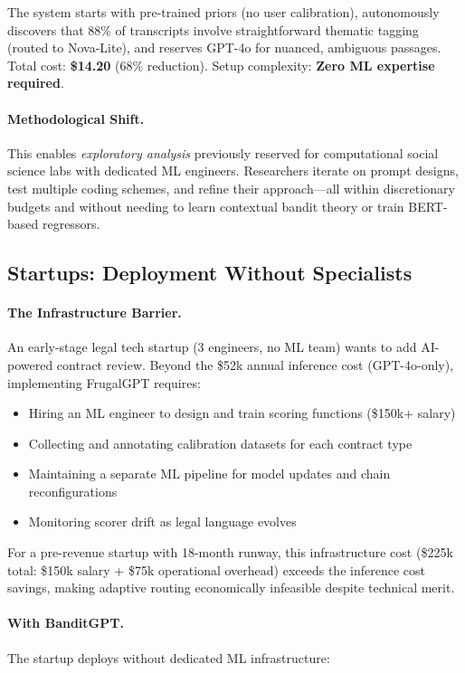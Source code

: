 The system starts with pre-trained priors (no user calibration), autonomously discovers that 88\% of transcripts involve straightforward thematic tagging (routed to Nova-Lite), and reserves GPT-4o for nuanced, ambiguous passages. Total cost: \textbf{\$14.20} (68\% reduction). Setup complexity: \textbf{Zero ML expertise required}.

\paragraph{Methodological Shift.} This enables \emph{exploratory analysis} previously reserved for computational social science labs with dedicated ML engineers. Researchers iterate on prompt designs, test multiple coding schemes, and refine their approach---all within discretionary budgets and without needing to learn contextual bandit theory or train BERT-based regressors.

\subsection{Startups: Deployment Without Specialists}

\paragraph{The Infrastructure Barrier.} An early-stage legal tech startup (3 engineers, no ML team) wants to add AI-powered contract review. Beyond the \$52k annual inference cost (GPT-4o-only), implementing FrugalGPT requires:
\begin{itemize}[leftmargin=*,nosep]
    \item Hiring an ML engineer to design and train scoring functions (\$150k+ salary)
    \item Collecting and annotating calibration datasets for each contract type
    \item Maintaining a separate ML pipeline for model updates and chain reconfigurations
    \item Monitoring scorer drift as legal language evolves
\end{itemize}

For a pre-revenue startup with 18-month runway, this infrastructure cost (\$225k total: \$150k salary + \$75k operational overhead) exceeds the inference cost savings, making adaptive routing economically infeasible despite technical merit.

\paragraph{With BanditGPT.} The startup deploys without dedicated ML infrastructure:


